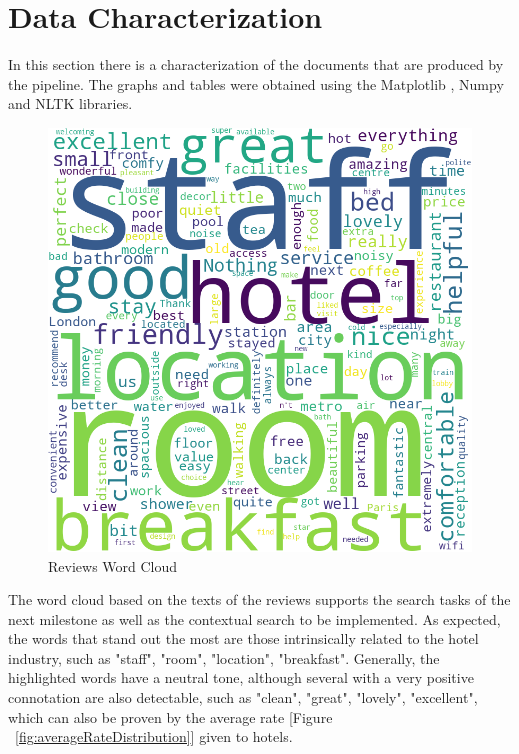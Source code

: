 \documentclass[sigconf]{acmart}
\begin{document}
\section{Data Characterization}

In this section there is a characterization of the documents that are produced by the pipeline. The graphs and tables were obtained using the Matplotlib \cite{Matplotlib}, Numpy \cite{Numpy} and NLTK \cite{NLTK} libraries.



\begin{figure}[h]
  \centering
  \includegraphics[width=\linewidth]{imgs/reviews_wordcloud.png}
  \caption{Reviews Word Cloud}
  \label{fig:wordcloud}
\end{figure}

The word cloud based on the texts of the reviews supports the search tasks of the next milestone as well as the contextual search to be implemented. As expected, the words that stand out the most are those intrinsically related to the hotel industry, such as "staff", "room", "location", "breakfast". Generally, the highlighted words have a neutral tone, although several with a very positive connotation are also detectable, such as "clean", "great", "lovely", "excellent", which can also be proven by the average rate [Figure ~\ref{fig:averageRateDistribution}] given to hotels.
\end{document}

